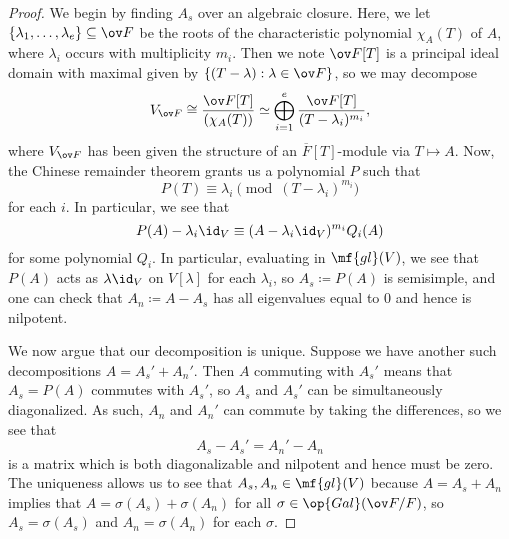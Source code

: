 \documentclass[../notes.tex]{subfiles}
\begin{document}
\begin{proof}
	We begin by finding $A_s$ over an algebraic closure. Here, we let $\{\lambda_1,\ldots,\lambda_e\}\subseteq\ov F$ be the roots of the characteristic polynomial $\chi_A(T)$ of $A$, where $\lambda_i$ occurs with multiplicity $m_i$. Then we note $\ov F[T]$ is a principal ideal domain with maximal given by $\{(T-\lambda):\lambda\in\ov F\}$, so we may decompose
	\[V_{\ov F}\cong\frac{\ov F[T]}{(\chi_A(T))}\simeq\bigoplus_{i=1}^e\frac{\ov F[T]}{(T-\lambda_i)^{m_i}},\]
	where $V_{\ov F}$ has been given the structure of an $\overline F[T]$-module via $T\mapsto A$. Now, the Chinese remainder theorem grants us a polynomial $P$ such that
	\[P(T)\equiv\lambda_i\pmod{(T-\lambda_i)^{m_i}}\]
	for each $i$. In particular, we see that
	\[P(A)-\lambda_i{\id_V}\equiv(A-\lambda_i{\id_V})^{m_i}Q_i(A)\]
	for some polynomial $Q_i$. In particular, evaluating in $\mf{gl}(V)$, we see that $P(A)$ acts as $\lambda\id_V$ on $V[\lambda]$ for each $\lambda_i$, so $A_s\coloneqq P(A)$ is semisimple, and one can check that $A_n\coloneqq A-A_s$ has all eigenvalues equal to $0$ and hence is nilpotent.

	We now argue that our decomposition is unique. Suppose we have another such decompositions $A=A_s'+A_n'$. Then $A$ commuting with $A_s'$ means that $A_s=P(A)$ commutes with $A_s'$, so $A_s$ and $A_s'$ can be simultaneously diagonalized. As such, $A_n$ and $A_n'$ can commute by taking the differences, so we see that
	\[A_s-A_s'=A_n'-A_n\]
	is a matrix which is both diagonalizable and nilpotent and hence must be zero. The uniqueness allows us to see that $A_s,A_n\in\mf{gl}(V)$ because $A=A_s+A_n$ implies that $A=\sigma(A_s)+\sigma(A_n)$ for all $\sigma\in\op{Gal}(\ov F/F)$, so $A_s=\sigma(A_s)$ and $A_n=\sigma(A_n)$ for each $\sigma$.
\end{proof}
\end{document}
